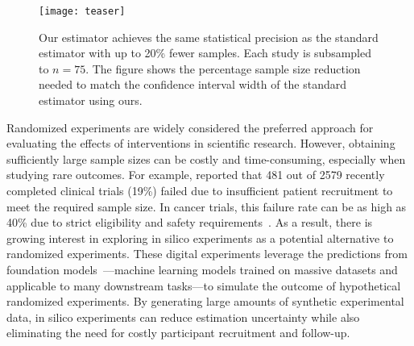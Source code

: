 \begin{wrapfigure}{r}{0.38\textwidth}
\vspace{-11mm}
\centering
\texttt{[image: teaser]} 
\caption{\small{Our estimator achieves the same statistical precision as the standard estimator with up to 20\% fewer samples. Each study is subsampled to $n=75$. The figure shows the percentage sample size reduction needed to match the confidence interval width of the standard estimator using ours.}}
\label{fig:teaser}
\vspace{-11mm}
\end{wrapfigure}
Randomized experiments are widely considered the preferred approach for evaluating the effects of interventions in scientific research. However, obtaining sufficiently large sample sizes can be costly and time-consuming, especially when studying rare outcomes. For example, \citet{carlisle2015unsuccessful} reported that 481 out of 2579 recently completed clinical trials (19\%) failed due to insufficient patient recruitment to meet the required sample size. In cancer trials, this failure rate can be as high as 40\% due to strict eligibility and safety requirements~\citep{villacampa2024accrual}. As a result, there is growing interest in exploring in silico experiments as a potential alternative to randomized experiments. These digital experiments leverage the predictions from foundation models~\citep{bommasani2021opportunities}---machine learning models trained on massive datasets and applicable to many downstream tasks---to simulate the outcome of hypothetical randomized experiments.  By generating large amounts of synthetic experimental data, in silico experiments can reduce estimation uncertainty while also eliminating  the need for costly participant recruitment and follow-up. 



